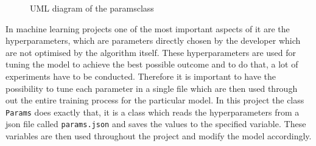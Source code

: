 \begin{figure}[htbp]
{
    }
	\caption{UML diagram of the \flqq params\frqq class}
	\label{fig:UML-Params}
\end{figure}
\noindent
In machine learning projects one of the most important aspects of it are the hyperparameters, which are parameters directly chosen by the developer which are not optimised by the algorithm itself. These hyperparameters are used for tuning the model to achieve the best possible outcome and to do that, a lot of experiments have to be conducted. Therefore it is important to have the possibility to tune each parameter in a single file which are then used through out the entire training process for the particular model. In this project the class \texttt{Params} does exactly that, it is a class which reads the hyperparameters from a json file called \texttt{params.json} and saves the values to the specified variable. These variables are then used throughout the project and modify the model accordingly.

